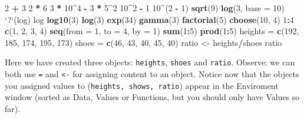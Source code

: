 \documentclass[]{article}
\newenvironment{Shaded}{\begin{snugshade}}{\end{snugshade}}
\newcommand{\KeywordTok}[1]{\textcolor[rgb]{0.13,0.29,0.53}{\textbf{#1}}}
\newcommand{\DataTypeTok}[1]{\textcolor[rgb]{0.13,0.29,0.53}{#1}}
\newcommand{\DecValTok}[1]{\textcolor[rgb]{0.00,0.00,0.81}{#1}}
\newcommand{\StringTok}[1]{\textcolor[rgb]{0.31,0.60,0.02}{#1}}
\newcommand{\OperatorTok}[1]{\textcolor[rgb]{0.81,0.36,0.00}{\textbf{#1}}}
\newcommand{\NormalTok}[1]{#1}
\begin{document}
\begin{Shaded}
\begin{Highlighting}[]
\DecValTok{2} \OperatorTok{+}\StringTok{ }\DecValTok{3}
\DecValTok{2} \OperatorTok{*}\StringTok{ }\DecValTok{6}
\DecValTok{3} \OperatorTok{*}\StringTok{ }\DecValTok{10}\OperatorTok{^}\DecValTok{4} \OperatorTok{-}\StringTok{ }\DecValTok{3} \OperatorTok{*}\StringTok{ }\DecValTok{5}\OperatorTok{^}\DecValTok{2}
\DecValTok{10}\OperatorTok{^}\DecValTok{2} \OperatorTok{-}\StringTok{ }\DecValTok{1}
\DecValTok{10}\OperatorTok{^}\NormalTok{(}\DecValTok{2} \OperatorTok{-}\StringTok{ }\DecValTok{1}\NormalTok{)}
\KeywordTok{sqrt}\NormalTok{(}\DecValTok{9}\NormalTok{)}
\KeywordTok{log}\NormalTok{(}\DecValTok{3}\NormalTok{, }\DataTypeTok{base =} \DecValTok{10}\NormalTok{)}
\StringTok{`}\DataTypeTok{?}\StringTok{`}\NormalTok{(log)}
\NormalTok{log}
\KeywordTok{log10}\NormalTok{(}\DecValTok{3}\NormalTok{)}
\KeywordTok{log}\NormalTok{(}\DecValTok{3}\NormalTok{)}
\KeywordTok{exp}\NormalTok{(}\DecValTok{34}\NormalTok{)}
\KeywordTok{gamma}\NormalTok{(}\DecValTok{3}\NormalTok{)}
\KeywordTok{factorial}\NormalTok{(}\DecValTok{5}\NormalTok{)}
\KeywordTok{choose}\NormalTok{(}\DecValTok{10}\NormalTok{, }\DecValTok{4}\NormalTok{)}
\DecValTok{1}\OperatorTok{:}\DecValTok{4}
\KeywordTok{c}\NormalTok{(}\DecValTok{1}\NormalTok{, }\DecValTok{2}\NormalTok{, }\DecValTok{3}\NormalTok{, }\DecValTok{4}\NormalTok{)}
\KeywordTok{seq}\NormalTok{(}\DataTypeTok{from =} \DecValTok{1}\NormalTok{, }\DataTypeTok{to =} \DecValTok{4}\NormalTok{, }\DataTypeTok{by =} \DecValTok{1}\NormalTok{)}
\KeywordTok{sum}\NormalTok{(}\DecValTok{1}\OperatorTok{:}\DecValTok{5}\NormalTok{)}
\KeywordTok{prod}\NormalTok{(}\DecValTok{1}\OperatorTok{:}\DecValTok{5}\NormalTok{)}
\NormalTok{heights =}\StringTok{ }\KeywordTok{c}\NormalTok{(}\DecValTok{192}\NormalTok{, }\DecValTok{185}\NormalTok{, }\DecValTok{174}\NormalTok{, }\DecValTok{195}\NormalTok{, }\DecValTok{173}\NormalTok{)}
\NormalTok{shoes =}\StringTok{ }\KeywordTok{c}\NormalTok{(}\DecValTok{46}\NormalTok{, }\DecValTok{43}\NormalTok{, }\DecValTok{40}\NormalTok{, }\DecValTok{45}\NormalTok{, }\DecValTok{40}\NormalTok{)}
\NormalTok{ratio <-}\StringTok{ }\NormalTok{heights}\OperatorTok{/}\NormalTok{shoes}
\NormalTok{ratio}
\end{Highlighting}
\end{Shaded}

Here we have created three objects: \texttt{heights}, \texttt{shoes} and
\texttt{ratio}. Observe: we can both use \texttt{=} and
\texttt{\textless{}-} for assigning content to an object. Notice now
that the objects you assigned values to
(\texttt{heights,\ shows,\ ratio}) appear in the Enviroment window
(sorted as Data, Values or Functions, but you should only have Values so
far).
\end{document}
